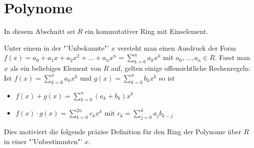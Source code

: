 ﻿\section{Polynome}

In diesem Abschnitt sei $R$ ein kommutativer Ring mit Einselement.

\begin{remark}
	Unter einem  in der "'Unbekannte"' $x$ versteht man einen Ausdruck der Form
	$f(x)=a_0+a_1x+a_2x^2+...+a_nx^n = \sum_{k=0}^{n} a_kx^k$ mit $a_0,...,a_n \in R$. Fasst man $x$
	als ein beliebiges Element von $R$ auf, gelten einige offensichtliche Rechenregeln: \\
	Ist $f(x)=\sum _{k=0}^{n} a_kx^k$ und $g(x)=\sum _{k=0}^{n} b_kx^k$ so ist
	\begin{itemize}
		\item $f(x)+g(x)=\sum _{k=0}^{n} (a_k+b_k)x^k$
		\item $f(x)\cdot g(x)=\sum _{k=0}^{2n} c_kx^k$ mit $c_k=\sum _{j=0}^{k} a_jb_{k-j}$
	\end{itemize}
	Dies motiviert die folgende präzise Definition für den Ring der Polynome über $R$ in einer "'Unbestimmten"'
	$x$.
\end{remark}

